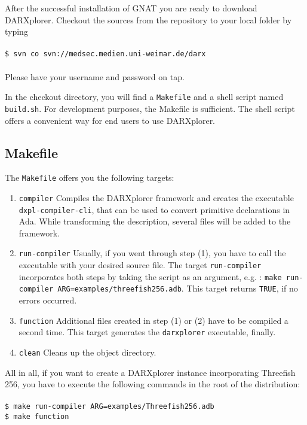 \documentclass{acmtrans2m}
\begin{document}
After the successful installation of GNAT you are ready to download DARXplorer.
Checkout the sources from the repository to your local folder by typing\\ \\
\noindent\hspace*{12mm}%
\texttt{\$ svn co svn://medsec.medien.uni-weimar.de/darx}\\ \\
Please have your username and password on tap.

In the checkout directory, you will find a \texttt{Makefile} and a shell script named \texttt{build.sh}. For development purposes, the Makefile is sufficient. The shell script offers a convenient way for end users to use DARXplorer.

\subsection{Makefile}
The \texttt{Makefile} offers you the following targets:
\begin{enumerate}
	\item \texttt{compiler} Compiles the DARXplorer framework and creates the executable \texttt{dxpl-compiler-cli}, that can be used to convert primitive declarations in Ada. While transforming the description, several files will be added to the framework.
	\item \texttt{run-compiler} Usually, if you went through step (1), you have to call the executable with your desired source file. The target \texttt{run-compiler} incorporates both steps by taking the script as an argument, e.g. : \texttt{make run-compiler ARG=examples/threefish256.adb}. This target returns \texttt{TRUE}, if no errors occurred.
	\item \texttt{function} Additional files created in step (1) or (2) have to be compiled a second time. This target generates the \texttt{darxplorer} executable, finally.
	\item \texttt{clean} Cleans up the object directory.
\end{enumerate}

All in all, if you want to create a DARXplorer instance incorporating Threefish 256, you have to execute the following commands in the root of the distribution:\\ \\
\noindent\hspace*{12mm}%
\texttt{\$ make run-compiler ARG=examples/Threefish256.adb}\\
\noindent\hspace*{12mm}%
\texttt{\$ make function}\\
\end{document}

